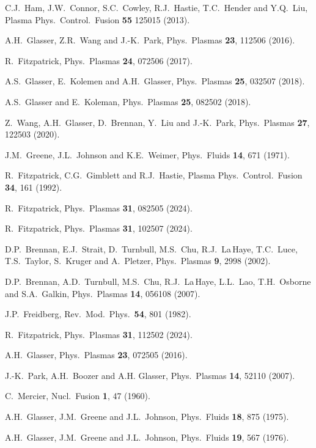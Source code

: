 \documentclass[12pt,prb,aps]{revtex4-1}
\begin{document}
\begin{thebibliography}{99}
 C.J.~Ham, J.W.~Connor, S.C.~Cowley, R.J.~Hastie, T.C.~Hender and Y.Q.~Liu, Plasma Phys.\ Control.\ Fusion {\bf 55} 125015 (2013).

 A.H.~Glasser, Z.R.~Wang and J.-K.~Park, Phys.\ Plasmas {\bf 23}, 112506 (2016).

 R.~Fitzpatrick, Phys.\ Plasmas {\bf 24}, 072506 (2017). 

 A.S.~Glasser, E.~Kolemen and A.H.~Glasser, Phys.\ Plasmas {\bf 25}, 032507 (2018).

 A.S.~Glasser and E.~Koleman, Phys.\ Plasmas {\bf 25}, 082502 (2018). 

 Z.~Wang, A.H.~Glasser, D.~Brennan, Y.~Liu and J.-K.~Park, Phys.\ Plasmas {\bf 27}, 122503 (2020).

 J.M.~Greene, J.L.~Johnson and K.E.~Weimer,  Phys.\  Fluids  {\bf 14}, 671 (1971).

 R.~Fitzpatrick, C.G.~Gimblett and R.J.~Hastie, Plasma Phys.\ Control.\ Fusion {\bf 34}, 161 (1992). 

 R.~Fitzpatrick, Phys.\ Plasmas {\bf 31}, 082505 (2024).

 R.~Fitzpatrick, Phys.\ Plasmas {\bf 31}, 102507 (2024).

 D.P.~Brennan, E.J.~Strait, D.~Turnbull, M.S.~Chu, R.J.~La\,Haye, T.C.~Luce, T.S.~Taylor, S.~Kruger and
A.~Pletzer, Phys.\ Plasmas {\bf 9}, 2998 (2002).

 D.P.~Brennan, A.D.~Turnbull, M.S.~Chu, R.J.~La\,Haye, L.L.~Lao, T.H.~Osborne and S.A.~Galkin, Phys.\ Plasmas {\bf 14}, 056108 (2007). 

 J.P.~Freidberg, Rev.\ Mod.\ Phys.\ {\bf 54},  801 (1982).

 R.~Fitzpatrick, Phys.\ Plasmas {\bf 31}, 112502 (2024).

 A.H.~Glasser, Phys.\ Plasmas {\bf 23}, 072505 (2016).

 J.-K.~Park, A.H.~Boozer and A.H. Glasser, Phys.\  Plasmas {\bf 14}, 52110 (2007).

 C.~Mercier, Nucl.\ Fusion {\bf 1}, 47 (1960).

 A.H.~Glasser, J.M.~Greene and J.L.~Johnson, Phys.\ Fluids {\bf 18}, 875 (1975).

 A.H.~Glasser, J.M.~Greene  and J.L.~Johnson, Phys.\ Fluids {\bf 19}, 567 (1976).


\end{thebibliography}
\end{document}

